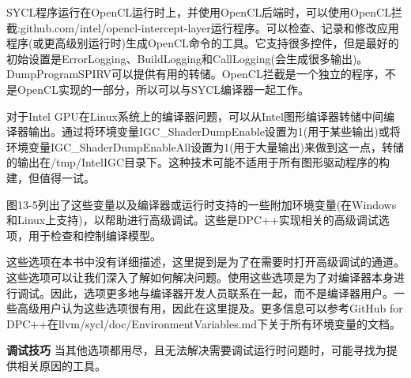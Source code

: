 SYCL程序运行在OpenCL运行时上，并使用OpenCL后端时，可以使用OpenCL拦截:github.com/intel/opencl-intercept-layer运行程序。可以检查、记录和修改应用程序(或更高级别运行时)生成OpenCL命令的工具。它支持很多控件，但是最好的初始设置是ErrorLogging、BuildLogging和CallLogging(会生成很多输出)。DumpProgramSPIRV可以提供有用的转储。OpenCL拦截是一个独立的程序，不是OpenCL实现的一部分，所以可以与SYCL编译器一起工作。\par

对于Intel GPU在Linux系统上的编译器问题，可以从Intel图形编译器转储中间编译器输出。通过将环境变量IGC\_ShaderDumpEnable设置为1(用于某些输出)或将环境变量IGC\_ShaderDumpEnableAll设置为1(用于大量输出)来做到这一点，转储的输出在/tmp/IntelIGC目录下。这种技术可能不适用于所有图形驱动程序的构建，但值得一试。\par

图13-5列出了这些变量以及编译器或运行时支持的一些附加环境变量(在Windows和Linux上支持)，以帮助进行高级调试。这些是DPC++实现相关的高级调试选项，用于检查和控制编译模型。\par

这些选项在本书中没有详细描述，这里提到是为了在需要时打开高级调试的通道。这些选项可以让我们深入了解如何解决问题。使用这些选项是为了对编译器本身进行调试。因此，选项更多地与编译器开发人员联系在一起，而不是编译器用户。一些高级用户认为这些选项很有用，因此在这里提及。更多信息可以参考GitHub for DPC++在llvm/sycl/doc/EnvironmentVariables.md下关于所有环境变量的文档。\par

\begin{tcolorbox}[colback=red!5!white,colframe=red!75!black]
\textbf{调试技巧} 当其他选项都用尽，且无法解决需要调试运行时问题时，可能寻找为提供相关原因的工具。
\end{tcolorbox}

